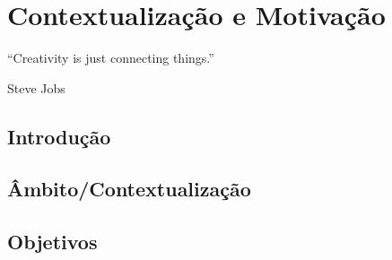 \chapter{Contextualização e Motivação}

\begin{flushright}
	\begin{quotebox50}
		\large
		“Creativity is just connecting things.”

		\tcblower
		Steve Jobs
	\end{quotebox50}
\end{flushright}

\section{Introdução}

\section{Âmbito/Contextualização}

\section{Objetivos}

